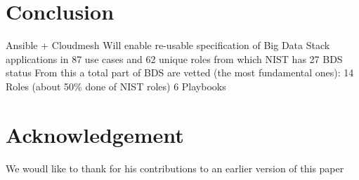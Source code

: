 \section{Conclusion}\label{S:conclusion}

Ansible + Cloudmesh
Will enable re-usable specification of Big Data Stack applications in 87 use cases and 62 unique roles from which NIST has 27
BDS status
From this a total part of BDS are vetted (the most fundamental ones): 
14 Roles  (about 50\% done of NIST roles)
6   Playbooks


\section*{Acknowledgement}

We woudl like to thank for his contributions to an
earlier version of this paper



